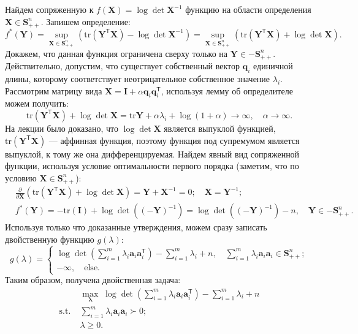 \documentclass[a4paper,12pt]{article}
\renewcommand{\geq}{\geqslant}
\renewcommand{\top}{\mathsf{T}}
\newcommand{\tr}{\text{tr}}
\begin{document}
\begin{enumerate}
Найдем сопряженную к $f(\mathbf{X}) = \log\det\mathbf{X}^{-1}$ функцию на области определения $\mathbf{X}\in\mathbf{S}^n_{++}$. Запишем определение:
\begin{equation*}
	f^*(\mathbf{Y}) = \sup\limits_{\mathbf{X}\in\mathbf{S}^n_{++}}\left(\tr(\mathbf{Y}^\top\mathbf{X}) - \log\det\mathbf{X}^{-1}\right) = \sup\limits_{\mathbf{X}\in\mathbf{S}^n_{++}}\left(\tr(\mathbf{Y}^\top\mathbf{X}) + \log\det\mathbf{X}\right).
\end{equation*}
Докажем, что данная функция ограничена сверху только на $\mathbf{Y}\in-\mathbf{S}^n_{++}$. Действительно, допустим, что существует собственный вектор $\mathbf{q}_i$ единичной длины, которому соответствует неотрицательное собственное значение $\lambda_i$. Рассмотрим матрицу вида $\mathbf{X} = \mathbf{I} + \alpha \mathbf{q}_i\mathbf{q}_i^\top$, используя лемму об определителе можем получить:
$$
\tr(\mathbf{Y}^\top\mathbf{X}) + \log\det\mathbf{X} = \tr{\mathbf{Y}} + \alpha \lambda_i + \log(1 + \alpha) \rightarrow\infty,\quad \alpha\rightarrow\infty.
$$
На лекции было доказано, что $\log\det\mathbf{X}$ является выпуклой функцией, $\tr(\mathbf{Y}^\top\mathbf{X})$ --- аффинная функция, поэтому функция под супремумом является выпуклой, к тому же она дифференцируемая. Найдем явный вид сопряженной функции, используя условие оптимальности первого порядка (заметим, что по условию $\mathbf{X}\in \mathbf{S}^n_{++}$):
\begin{equation*}
\begin{aligned}
	&\frac{\partial}{\partial\mathbf{X}}\left(\tr(\mathbf{Y}^\top\mathbf{X}) + \log\det\mathbf{X}\right) =\mathbf{Y} + \mathbf{X}^{-1} = 0;\quad \mathbf{X} = \mathbf{Y}^{-1};\\
	 &f^*(\mathbf{Y}) = -\tr(\mathbf{I}) + \log\det((-\mathbf{Y})^{-1}) = \log\det((-\mathbf{Y})^{-1}) - n,\quad \mathbf{Y}\in-\mathbf{S}^n_{++}.
\end{aligned}
\end{equation*}
Используя только что доказанные утверждения, можем  сразу записать двойственную функцию $g(\lambda)$:
\begin{equation*}
	g(\lambda) = \begin{cases}
		\log\det\left( \sum_{i=1}^m \lambda_i\mathbf{a}_i\mathbf{a}_i^\top\right) - \sum_{i=1}^m\lambda_i + n,\quad \sum\limits_{i=1}^m \lambda_i\mathbf{a}_i\mathbf{a}_i \in \mathbf{S}^n_{++};\\
		-\infty,\quad\text{else}.
	\end{cases}
\end{equation*}
Таким образом, получена двойственная задача:
\begin{equation*}
	\begin{aligned}
		& \max_{\mathbf{\lambda}}\; \log\det\left( \sum_{i=1}^m \lambda_i\mathbf{a}_i\mathbf{a}_i^\top\right) - \sum_{i=1}^m\lambda_i + n\\
		\text{s.t.}\; & \sum\limits_{i=1}^m \lambda_i\mathbf{a}_i\mathbf{a}_i \succ 0;\\
		& \lambda \geq 0.
	\end{aligned}
\end{equation*}


\end{enumerate}
\end{document}
